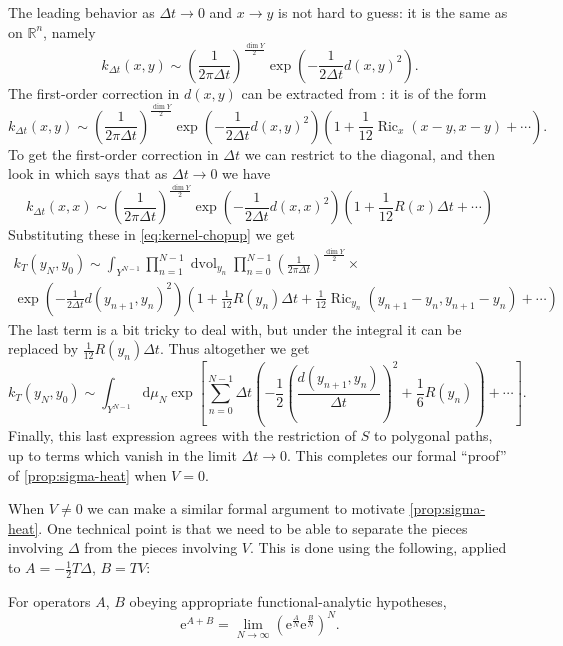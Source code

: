 \documentclass[12pt,letterpaper,reqno]{article}
\numberwithin{equation}{section}
\newcommand{\R}{\ensuremath{\mathbb R}}
\newcommand{\half}{\ensuremath{\frac{1}{2}}}
\newcommand{\e}{{\mathrm e}}
\newcommand{\de}{\mathrm{d}}
\DeclareMathOperator{\dvol}{dvol}
\DeclareMathOperator{\Ric}{Ric}
\newcommand{\fixme}[1]{{\color{orange}{[#1]}}}
\begin{document}
The leading behavior as $\Delta t \to 0$ and $x \to y$ 
is not hard to guess: it is the same as on $\R^n$, namely
\begin{equation}
  k_{\Delta t}(x,y) \sim \left( \frac{1}{2 \pi \Delta t} \right)^{\frac{\dim Y}{2}} \exp \left( - \frac{1}{2 \Delta t} d(x,y)^2 \right).
\end{equation}
The first-order correction in $d(x,y)$ can be extracted from \cite{Berline2004}: it is of the form
\begin{equation}
  k_{\Delta t}(x,y) \sim \left( \frac{1}{2 \pi \Delta t} \right)^{\frac{\dim Y}{2}} \exp \left( - \frac{1}{2 \Delta t} d(x,y)^2 \right) \left( 1 + \frac{1}{12} \Ric_x(x-y,x-y) + \cdots \right).
\end{equation}
To get the first-order correction in $\Delta t$ we can restrict to the diagonal,
and then look in \cite{Roe1988a} which says that 
as $\Delta t \to 0$ we have
\begin{equation}
  k_{\Delta t}(x,x) \sim \left( \frac{1}{2 \pi \Delta t} \right)^{\frac{\dim Y}{2}} \exp \left( - \frac{1}{2 \Delta t} d(x,x)^2 \right) \left( 1 + \frac{1}{12} R(x) \Delta t + \cdots \right)
\end{equation}
Substituting these in \eqref{eq:kernel-chopup} we get
\begin{multline}
  k_T(y_N, y_0) \sim \int_{Y^{N-1}} \prod_{n=1}^{N-1} \dvol_{y_n} \prod_{n=0}^{N-1}\left( \frac{1}{2 \pi \Delta t} \right)^{\frac{\dim Y}{2}} \times \\ 
  \exp \left( - \frac{1}{2 \Delta t} d(y_{n+1},y_n)^2 \right) \left(1 + \frac{1}{12} R(y_n) \Delta t + \frac{1}{12} \Ric_{y_n}(y_{n+1}-y_n,y_{n+1}-y_n) + \cdots \right)
\end{multline}
The last term is a bit tricky to deal with, but under the integral it can be replaced
by $\frac{1}{12} R(y_n) \Delta t$. \fixme{explain how} 
Thus altogether we get
\begin{equation}
 k_T(y_N, y_0)  \sim  \int_{Y^{N-1}} \de \mu_N \exp \left[ \sum_{n=0}^{N-1} \Delta t \left( - \half \left(\frac{d(y_{n+1},y_n)}{\Delta t}\right)^2 + \frac{1}{6} R(y_n) \right) + \cdots \right].
\end{equation}
Finally, this last expression agrees with
the restriction of $S$ to polygonal paths, up to terms which
vanish in the limit $\Delta t \to 0$.
This completes our formal ``proof'' of \autoref{prop:sigma-heat}
when $V = 0$.

When $V \neq 0$ we can make a similar formal argument to motivate
\autoref{prop:sigma-heat}.
One technical point is that we need to be able to separate
the pieces involving $\Delta$ from the pieces involving $V$.
This is done using the following, 
applied to $A = -\half T \Delta$, $B = T V$:
\begin{prop} \label{prop:trotter}
For operators $A$, $B$ obeying appropriate functional-analytic hypotheses,
\begin{equation}
  \e^{A+B} = \lim_{N \to \infty} \left(\e^{\frac{A}{N}} \e^{\frac{B}{N}}\right)^N.
\end{equation}
\end{prop}
\end{document}
